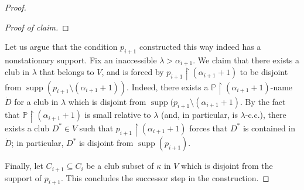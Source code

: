 \documentclass[10pt,a4paper]{amsart}
\newcommand{\po}{\mathbb{P}}
\renewcommand{\restriction}{\mathbin\upharpoonright}    %
\DeclareMathOperator{\supp}{supp}
\begin{document}
\begin{proof}
\begin{proof}[Proof of claim]
\end{proof}
    Let us argue that the condition $p_{i+1}$ constructed this way indeed has a nonstationary support. Fix an inaccessible $\lambda>\alpha_{i+1}$. We claim that there exists a club in $\lambda$ that belongs to $V$, and is forced by $p_{i+1}\restriction (\alpha_{i+1}+1)$ to be disjoint from $\supp(p_{i+1}\setminus (\alpha_{i+1}+1))$. Indeed, there exists a $\po\restriction (\alpha_{i+1}+1)$-name $\dot{D}$ for a club in $\lambda$ which is disjoint from $\supp(p_{i+1}\setminus (\alpha_{i+1}+1)$. By the fact that $\po\restriction (\alpha_{i+1}+1)$ is small relative to $\lambda$ (and, in particular, is $\lambda$-c.c.), there exists a club $D^*\in V$ such that $p_{i+1}\restriction (\alpha_{i+1}+1)$ forces that $D^*$ is contained in $\dot{D}$; in particular, $D^*$ is disjoint from $\supp(p_{i+1})$.
    
    Finally, let $C_{i+1}\subseteq C_i$ be a club subset of $\kappa$ in $V$ which is  disjoint from the support of $p_{i+1}$. This concludes the successor step in the construction.


\end{proof}
\end{document}
